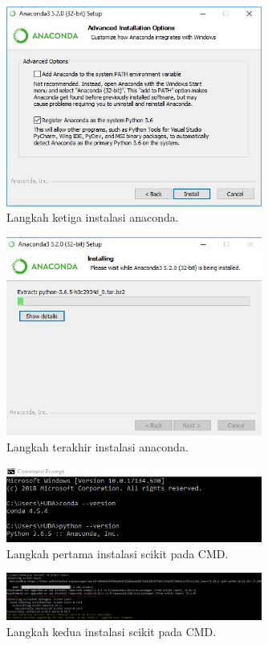 \begin{figure}[ht]\centerline{\includegraphics[width=0.75\textwidth]{figures/huda/4.JPG}}\caption{Langkah ketiga instalasi anaconda.}\end{figure}
\begin{figure}[ht]\centerline{\includegraphics[width=0.75\textwidth]{figures/huda/5.JPG}}\caption{Langkah terakhir instalasi anaconda.}\end{figure}
\begin{figure}[ht]\centerline{\includegraphics[width=0.75\textwidth]{figures/huda/6.JPG}}\caption{Langkah pertama instalasi scikit pada CMD.}\end{figure}
\begin{figure}[ht]\centerline{\includegraphics[width=0.75\textwidth]{figures/huda/7.JPG}}\caption{Langkah kedua instalasi scikit pada CMD.}\end{figure}
